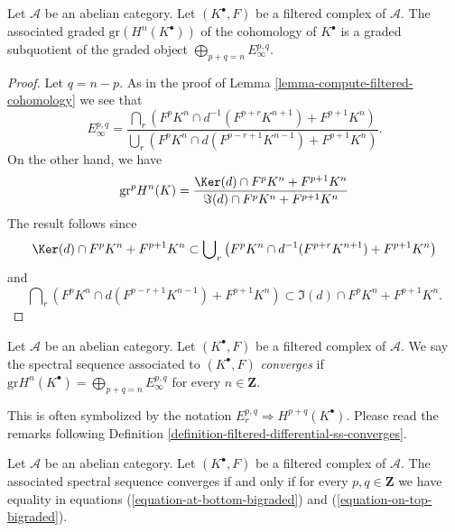 \begin{lemma}
\label{lemma-compute-cohomology-filtered-complex}
Let $\mathcal{A}$ be an abelian category.
Let $(K^\bullet, F)$ be a filtered complex of $\mathcal{A}$.
The associated graded $\text{gr}(H^n(K^\bullet))$ of the cohomology of
$K^\bullet$ is a graded subquotient of the graded object
$\bigoplus_{p + q = n} E_\infty^{p, q}$.
\end{lemma}

\begin{proof}
Let $q = n - p$. As in the proof of
Lemma \ref{lemma-compute-filtered-cohomology} we see that
$$
E_\infty^{p, q} =
\frac{\bigcap_r (F^pK^{n} \cap d^{-1}(F^{p + r}K^{n + 1})
+ F^{p + 1}K^{n})}
{\bigcup_r (F^pK^{n} \cap d(F^{p - r + 1}K^{n - 1})
+ F^{p + 1}K^{n})}.
$$
On the other hand, we have
\begin{equation}
\label{equation-filtration-cohomology}
\text{gr}^p H^{n}(K) =
\frac{\Ker(d) \cap F^pK^{n} + F^{p + 1}K^{n}}
{\Im(d) \cap F^pK^{n} + F^{p + 1}K^{n}}
\end{equation}
The result follows since
\begin{equation}
\label{equation-on-top-bigraded}
\Ker(d) \cap F^pK^{n} + F^{p + 1}K^{n}
\subset
\bigcup\nolimits_r
\left(
F^pK^{n} \cap d^{-1}(F^{p + r}K^{n + 1}) + F^{p + 1}K^{n}
\right)
\end{equation}
and
\begin{equation}
\label{equation-at-bottom-bigraded}
\bigcap\nolimits_r
\left(
F^pK^{n} \cap d(F^{p - r + 1}K^{n - 1}) + F^{p + 1}K^{n}
\right)
\subset
\Im(d) \cap F^pK^{n} + F^{p + 1}K^{n}.
\end{equation}
\end{proof}

\begin{definition}
\label{definition-filtered-complex-ss-converges}
Let $\mathcal{A}$ be an abelian category.
Let $(K^\bullet, F)$ be a filtered complex of $\mathcal{A}$.
We say the spectral sequence associated to $(K^\bullet, F)$
{\it converges} if
$\text{gr} H^n(K^\bullet) = \bigoplus_{p + q = n} E_{\infty}^{p, q}$
for every $n \in \mathbf{Z}$.
\end{definition}

\noindent
This is often symbolized by the notation
$E_r^{p, q} \Rightarrow H^{p + q}(K^\bullet)$.
Please read the remarks following
Definition \ref{definition-filtered-differential-ss-converges}.

\begin{lemma}
\label{lemma-filtered-complex-ss-converges}
Let $\mathcal{A}$ be an abelian category.
Let $(K^\bullet, F)$ be a filtered complex of $\mathcal{A}$.
The associated spectral sequence converges if and only if for every
$p, q \in \mathbf{Z}$ we have equality in equations
(\ref{equation-at-bottom-bigraded}) and (\ref{equation-on-top-bigraded}).
\end{lemma}

